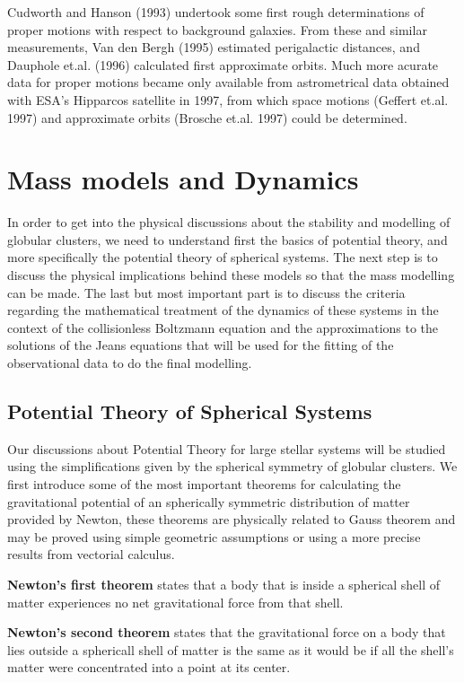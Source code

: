 Cudworth and Hanson (1993) undertook some first rough determinations of proper motions with respect to background galaxies. From these and similar measurements, Van den Bergh (1995) estimated perigalactic distances, and Dauphole et.al. (1996) calculated first approximate orbits. Much more acurate data for proper motions became only available from astrometrical data obtained with ESA's Hipparcos satellite in 1997, from which space motions (Geffert et.al. 1997) and approximate orbits (Brosche et.al. 1997) could be determined.

\section{Mass models and Dynamics}

In order to get into the physical discussions about the stability and modelling of globular clusters, we need to understand first the basics of potential theory, and more specifically the potential theory of spherical systems. The next step is to discuss the physical implications behind these models so that the mass modelling can be made. The last but most important part is to discuss the criteria regarding the mathematical treatment of the dynamics of these systems in the context of the collisionless Boltzmann equation and the approximations to the solutions of the Jeans equations that will be used for the fitting of the observational data to do the final modelling.

\subsection{Potential Theory of Spherical Systems}

Our discussions about Potential Theory for large stellar systems will be studied using the simplifications given by the spherical symmetry of globular clusters. We first introduce some of the most important theorems for calculating the gravitational potential of an spherically symmetric distribution of matter provided by Newton, these theorems are physically related to Gauss theorem and may be proved using simple geometric assumptions or using a more precise results from vectorial calculus.

\textbf{Newton's first theorem} states that a body that is inside a spherical shell of matter experiences no net gravitational force from that shell. 

\textbf{Newton's second theorem} states that the gravitational force on a body that lies outside a sphericall shell of matter is the same as it would be if all the shell's matter were concentrated into a point at its center. 

